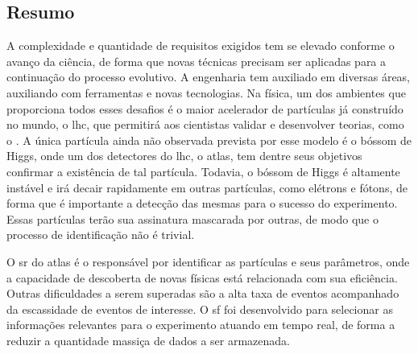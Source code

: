 \vfill
\begin{center}
\section*{Resumo\label{Resumo}}
\end{center}


A complexidade e quantidade de requisitos exigidos tem se elevado conforme o avanço da ciência, 
de forma que novas técnicas precisam ser aplicadas para a continuação do processo evolutivo.
A engenharia tem auxiliado em diversas áreas, auxiliando com ferramentas e novas tecnologias. 
Na física, um dos ambientes que proporciona todos esses desafios é o maior acelerador 
de partículas já construído no mundo, o \acrshort{lhc}, que permitirá aos
cientistas validar e desenvolver teorias, como o . A
única partícula ainda não observada prevista por esse modelo é o bóssom
de Higgs, onde um dos detectores do \acrshort{lhc}, o \acrshort{atlas}, tem dentre seus objetivos 
confirmar a existência de tal partícula. Todavia, o bóssom de Higgs é altamente instável 
e irá decair rapidamente em outras partículas, como elétrons e fótons, de forma que é importante 
a detecção das mesmas para o sucesso do experimento. Essas partículas terão sua
assinatura mascarada por outras, de modo que o processo de identificação não é
trivial. 

O \gls{sr} do \acrshort{atlas} é o responsável por identificar as
partículas e seus parâmetros, onde a capacidade de descoberta de novas físicas 
está relacionada com sua eficiência. Outras dificuldades a serem superadas são a alta taxa de
eventos acompanhado da escassidade de eventos de interesse. 
O \gls{sf} foi desenvolvido para selecionar as informações relevantes para o experimento 
atuando em tempo real, de forma a reduzir a quantidade massiça de dados a ser armazenada.



